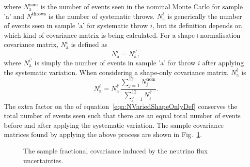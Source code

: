 where $N_{\textrm{a}}^{\textrm{nom}}$ is the number of events seen in the nominal Monte Carlo for sample 'a' and $N^{\textrm{throws}}$ is the number of systematic throws. $N_{\textrm{a}}^{i}$ is generically the number of events seen in sample 'a' for systematic throw $i$, but its definition depends on which kind of covariance matrix is being calculated.  For a shape+normalisation covariance matrix, $N_{\textrm{a}}^{i}$ is defined as 
\begin{equation}
  N_{\textrm{a}}^{i} = N^{i\prime}_{\textrm{a}}, 
  \label{eqn:NVariedDef}
\end{equation}
where $N^{i\prime}_{\textrm{a}}$ is simply the number of events in sample 'a' for throw $i$ after applying the systematic variation.  When considering a shape-only covariance matrix, $N_{\textrm{a}}^{i}$ is 
\begin{equation}
  N_{\textrm{a}}^{i} = N^{i\prime}_{\textrm{a}}\frac{\displaystyle\sum_{j=1}^{12}N_{\textrm{j}}^{\textrm{nom}}}{\displaystyle\sum_{j=1}^{12}N^{i\prime}_{\textrm{j}}}. 
  \label{eqn:NVariedShapeOnlyDef}
\end{equation}
The extra factor on the  of equation~\ref{eqn:NVariedShapeOnlyDef} conserves the total number of events seen such that there are an equal total number of events before and after applying the systematic variation.  The sample covariance matrices found by applying the above process are shown in Fig.~\ref{fig:FluxCovarianceMatrices}.
\begin{figure}%
  \centering
  \caption{The sample fractional covariance induced by the neutrino flux uncertainties.}
  \label{fig:FluxCovarianceMatrices}
\end{figure}
